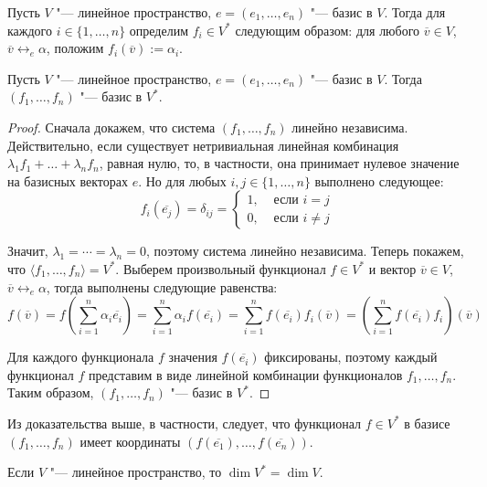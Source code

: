 \begin{definition}
	Пусть $V$ "--- линейное пространство, $e = (e_1, \dots, e_n)$ "--- базис в $V$. Тогда для каждого $i \in \{1, \dots, n\}$ определим $f_i \in V^*$ следующим образом: для любого $\overline{v} \in V$, $\overline{v} \leftrightarrow_{e} \alpha$, положим $f_i(\overline{v}) := \alpha_i$.
\end{definition}

\begin{proposition}
	Пусть $V$ "--- линейное пространство, $e = (e_1, \dots, e_n)$ "--- базис в $V$. Тогда $(f_1, \dots, f_n)$ "--- базис в $V^*$.
\end{proposition}

\begin{proof}
	Сначала докажем, что система $(f_1, \dots, f_n)$ линейно независима. Действительно, если существует нетривиальная линейная комбинация $\lambda_1f_1 + \dots + \lambda_nf_n$, равная нулю, то, в частности, она принимает нулевое значение на базисных векторах $e$. Но для любых $i, j \in \{1, \dotsc, n\}$ выполнено следующее:
	\[f_i(\overline{e_j}) = \delta_{ij} = \begin{cases}
		1,&\text{ если }i = j
		\\
		0,&\text{ если }i \ne j
	\end{cases}\]
	
	Значит, $\lambda_1 = \dotsb = \lambda_n = 0$, поэтому система линейно независима. Теперь покажем, что $\langle f_1, \dots, f_n\rangle = V^*$. Выберем произвольный функционал $f \in V^*$ и вектор $\overline{v} \in V$, $\overline{v} \leftrightarrow_{e} \alpha$, тогда выполнены следующие равенства:
	\[f(\overline{v}) = f\left(\sum_{i = 1}^n\alpha_i\overline{e_i}\right) = \sum_{i = 1}^n\alpha_if(\overline{e_i}) =  \sum_{i = 1}^nf(\overline{e_i})f_i(\overline{v}) = \left(\sum_{i = 1}^nf(\overline{e_i})f_i\right)(\overline{v})\]
	
	Для каждого функционала $f$ значения $f(\overline{e_i})$ фиксированы, поэтому каждый функционал $f$ представим в виде линейной комбинации функционалов $f_1, \dotsc, f_n$. Таким образом, $(f_1, \dots, f_n)$ "--- базис в $V^*$.
\end{proof}

\begin{note}
	Из доказательства выше, в частности, следует, что функционал $f \in V^*$ в базисе $(f_1, \dots, f_n)$ имеет координаты $(f(\overline{e_1}), \dots, f(\overline{e_n}))$.
\end{note}

\begin{corollary}
	Если $V$ "--- линейное пространство, то $\dim{V^*} = \dim{V}$.
\end{corollary}

